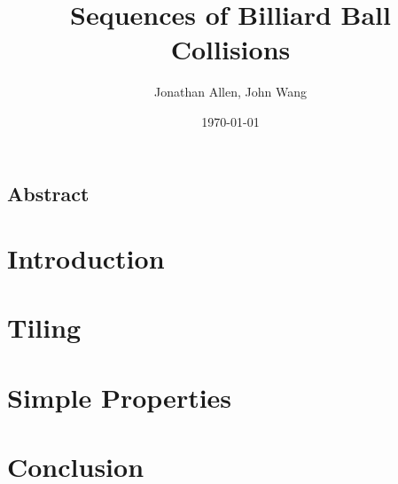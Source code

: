 \documentclass[12pt]{amsart}   %
\begin{document}
\graphicspath{ {figures/} }

\title[Billiards]{Sequences of Billiard Ball Collisions}
 
\author{Jonathan Allen, John Wang}
\date{\today}

\maketitle

\subsection*{Abstract}

\section{Introduction}


\section{Tiling}


\section{Simple Properties}


\section{Conclusion}


\begin{appendix}
\end{appendix}


\end{document}
